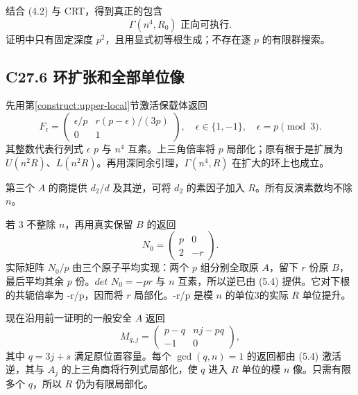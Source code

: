 {结合} {(4.2)} {与} {CRT，得到真正的包含} \[
\boxed{\Gamma(n^4,R_0)\text{ 正向可执行}.}
\tag{C27.5.4}
\] {证明中只有固定深度} {\ensuremath{p^{2}}，且用显式初等根生成；不存在逐} {\ensuremath{p}} {的有限群搜索。}

\subsection*{\texorpdfstring{{C27.6} {环扩张和全部单位像}}{C27.6 环扩张和全部单位像}}\label{C27-h173}

{先用}第\ref{construct:upper-local}节{激活保载体返回} \[
F_\epsilon=
\begin{pmatrix}
\epsilon/p&r(p-\epsilon)/(3p)\\
0&1
\end{pmatrix},
\quad\epsilon\in\{1,-1\},\quad\epsilon=p\pmod3.
\] {其整数代表行列式} {\ensuremath{\epsilon }} {\ensuremath{p}} {与} {\ensuremath{n^{4}}} {互素。上三角倍率将} {\ensuremath{p}} {局部化；原有根于是扩展为} {\ensuremath{U(n^{2}R)}、\ensuremath{L(n^{2}R)}。再用深同余引理，\ensuremath{\Gamma (n^{4},R)}} {在扩大的环上也成立。}

{第三个} {\ensuremath{A}} {的商提供} {\ensuremath{d_{2}/d}} {及其逆，可将} {\ensuremath{d_{2}}} {的素因子加入} {\ensuremath{R}。所有反演素数均不除} {\ensuremath{n}。}

{若} {3} {不整除} {\ensuremath{n}，再用真实保留} {\ensuremath{B}} {的返回} \[
N_0=\begin{pmatrix}p&0\\2&-r\end{pmatrix}.
\] {实际矩阵} {\ensuremath{N_{0}/p}} {由三个原子平均实现：两个} {\ensuremath{p}} {组分别全取原} {\ensuremath{A}，留下} {\ensuremath{r}} {份原} {\ensuremath{B}，最后平均其余} {\ensuremath{p}} {份。\ensuremath{det}} {\ensuremath{N_{0}=-pr}} {与} {\ensuremath{n}} {互素，所以逆已由} {(5.4)} {提供。它对下根的共轭倍率为} {-r/p，因而将} {\ensuremath{r}} {局部化。-r/p} {是模} {\ensuremath{n}} {的单位3的实际} {\ensuremath{R}} {单位提升。}

{现在沿用前一证明的一般安全} {\ensuremath{A}} {返回} \[
M_{q,j}=\begin{pmatrix}p-q&nj-pq\\-1&0\end{pmatrix},
\] {其中} {\ensuremath{q=3j+s}} {满足原位置容量。每个} {\ensuremath{\operatorname{gcd}(q,n)=1}} {的返回都由} {(5.4)} {激活逆，其与} {\ensuremath{A_{j}}} {的上三角商将行列式局部化，使} {\ensuremath{q}} {进入} {\ensuremath{R}} {单位的模} {\ensuremath{n}} {像。只需有限多个} {\ensuremath{q}，所以} {\ensuremath{R}} {仍为有限局部化。}

